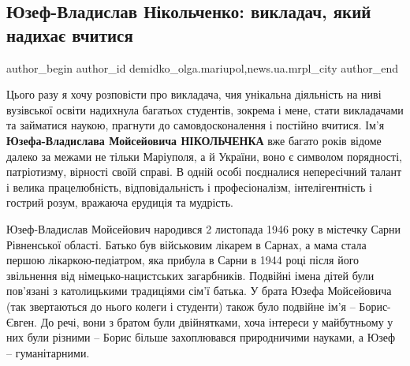  
 
 
 
 
 
\subsection{Юзеф-Владислав Нікольченко: викладач, який надихає вчитися}
\label{sec:02_11_2021.stz.news.ua.mrpl_city.1.juzef_vladislav_nikolchenko}
 
\ifcmt
 author_begin
   author_id demidko_olga.mariupol,news.ua.mrpl_city
 author_end
\fi


Цього разу я хочу розповісти про викладача, чия унікальна діяльність на ниві
вузівської освіти надихнула багатьох студентів, зокрема і мене, стати
викладачами та займатися наукою, прагнути до самовдосконалення і постійно
вчитися. Ім'я \textbf{Юзефа-Владислава Мойсейовича НІКОЛЬЧЕНКА} вже багато років відоме
далеко за межами не тільки Маріуполя, а й України, воно є символом порядності,
патріотизму, вірності своїй справі. В одній особі поєдналися непересічний
талант і велика працелюбність, відповідальність і професіоналізм,
інтелігентність і гострий розум, вражаюча ерудиція та мудрість.


Юзеф-Владислав Мойсейович народився 2 листопада 1946 року в містечку Сарни
Рівненської області. Батько був військовим лікарем в Сарнах, а мама стала
першою лікаркою-педіатром, яка прибула в Сарни в 1944 році після його
звільнення від німецько-нацистських загарбників. Подвійні імена дітей були
пов'язані з католицькими традиціями сім'ї батька. У брата Юзефа Мойсейовича
(так звертаються до нього колеги і студенти) також було подвійне ім'я –
Борис-Євген. До речі, вони з братом були двійнятками, хоча інтереси у
майбутньому у них були різними – Борис більше захоплювався природничими
науками, а Юзеф – гуманітарними.

